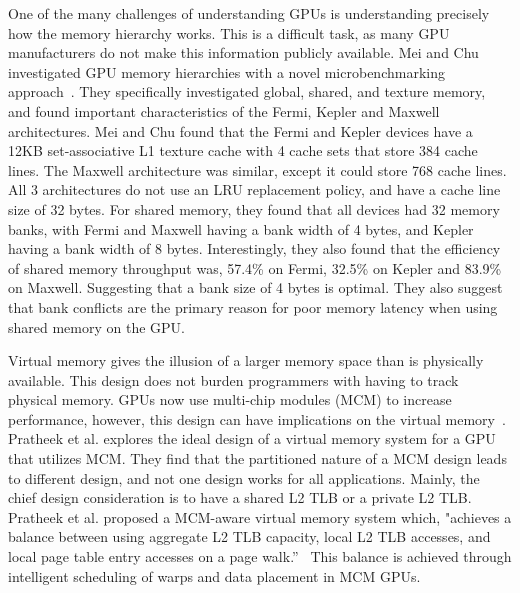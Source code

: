 One of the many challenges of understanding GPUs is understanding precisely how the memory hierarchy works.
This is a difficult task, as many GPU manufacturers do not make this information publicly available.
Mei and Chu investigated GPU memory hierarchies with a novel microbenchmarking approach~\cite{Mei2015}.
They specifically investigated global, shared, and texture memory, and found important characteristics of the Fermi, Kepler and Maxwell architectures.
Mei and Chu found that the Fermi and Kepler devices have a 12KB set-associative L1 texture cache with 4 cache sets that store 384 cache lines.
The Maxwell architecture was similar, except it could store 768 cache lines.
All 3 architectures do not use an LRU replacement policy, and have a cache line size of 32 bytes.
For shared memory, they found that all devices had 32 memory banks, with Fermi and Maxwell having a bank width of 4 bytes, and Kepler having a bank width of 8 bytes.
Interestingly, they also found that the efficiency of shared memory throughput was, 57.4\% on Fermi, 32.5\% on Kepler and 83.9\% on Maxwell.
Suggesting that a bank size of 4 bytes is optimal.
They also suggest that bank conflicts are the primary reason for poor memory latency when using shared memory on the GPU.

Virtual memory gives the illusion of a larger memory space than is physically available.
This design does not burden programmers with having to track physical memory.
GPUs now use multi-chip modules (MCM) to increase performance, however, this design can have implications on the virtual memory~\cite{Pratheek2023}.
Pratheek et al. explores the ideal design of a virtual memory system for a GPU that utilizes MCM.
They find that the partitioned nature of a MCM design leads to different design, and not one design works for all applications.
Mainly, the chief design consideration is to have a shared L2 TLB or a private L2 TLB.
Pratheek et al. proposed a MCM-aware virtual memory system which, "achieves a balance between using aggregate L2 TLB capacity, local L2 TLB accesses, and local page table entry accesses on a page walk.''~\cite{Pratheek2023}
This balance is achieved through intelligent scheduling of warps and data placement in MCM GPUs.
